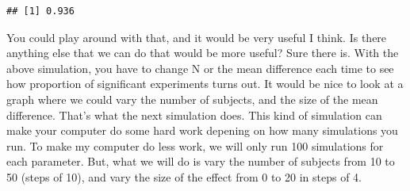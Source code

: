\documentclass[
]{book}
\begin{document}
\begin{verbatim}
## [1] 0.936
\end{verbatim}

You could play around with that, and it would be very useful I think. Is there anything else that we can do that would be more useful? Sure there is. With the above simulation, you have to change N or the mean difference each time to see how proportion of significant experiments turns out. It would be nice to look at a graph where we could vary the number of subjects, and the size of the mean difference. That's what the next simulation does. This kind of simulation can make your computer do some hard work depening on how many simulations you run. To make my computer do less work, we will only run 100 simulations for each parameter. But, what we will do is vary the number of subjects from 10 to 50 (steps of 10), and vary the size of the effect from 0 to 20 in steps of 4.
\end{document}
